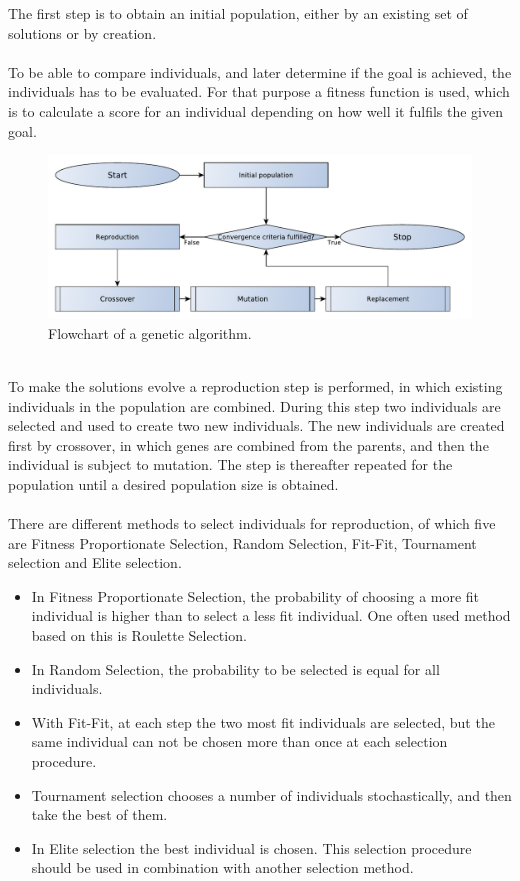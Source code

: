 The first step is to obtain an initial population, either by an existing set of solutions or by creation.\\\\
To be able to compare individuals, and later determine if the goal is achieved, the individuals has to be evaluated. For that purpose a fitness function is used, which is to calculate a score for an individual depending on how well it fulfils the given goal.\label{fitnessf}
\begin{figure}[!htb]
	\centering
	\includegraphics[width=\textwidth]{chapter_4_methods/GeneticFlowChart-Generic}
  	\caption[Flowchart of a genetic algorithm]
  	{Flowchart of a genetic algorithm.}
	\label{GeneticFlowChart-generic}
\end{figure}
\\To make the solutions evolve a reproduction step is performed, in which existing individuals in the population are combined. During this step two individuals are selected and used to create two new individuals. The new individuals are created first by crossover, in which genes are combined from the parents, and then the individual is subject to mutation. The step is thereafter repeated for the population until a desired population size is obtained.\\\\
There are different methods to select individuals for reproduction, of which five are Fitness Proportionate Selection, Random Selection, Fit-Fit, Tournament selection and Elite selection.
\begin{itemize}
\item In Fitness Proportionate Selection, the probability of choosing a more fit individual is higher than to select a less fit individual. One often used method based on this is Roulette Selection.%
\item In Random Selection, the probability to be selected is equal for all individuals. 
\item With Fit-Fit, at each step the two most fit individuals are selected, but the same individual can not be chosen more than once at each selection procedure.
\item Tournament selection chooses a number of individuals stochastically, and then take the best of them.
\item In Elite selection the best individual is chosen. This selection procedure should be used in combination with another selection method.
\end{itemize}
